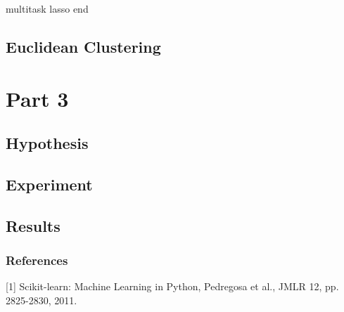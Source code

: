 \documentclass{article} %
\begin{document}
multitask lasso end

\subsection{Euclidean Clustering}


\section{Part 3}

\subsection{Hypothesis}

\subsection{Experiment}

\subsection{Results}




\subsubsection*{References}

\small{
[1] Scikit-learn: Machine Learning in Python, Pedregosa et al., JMLR 12, pp. 2825-2830, 2011.
}
\end{document}
